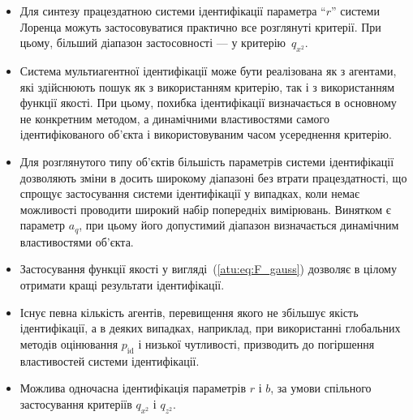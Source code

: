 \begin{itemize}

  \item
    Для синтезу працездатною системи ідентифікації параметра
    ``$r$'' системи Лоренца можуть застосовуватися практично все
    розглянуті критерії. При цьому, більший діапазон застосовності
    --- у критерію~$ q_{x^2} $.

  \item
    Система мультиагентної ідентифікації може бути реалізована
    як з агентами, які здійснюють пошук як з використанням
    критерію, так і з використанням функції якості. При цьому,
    похибка ідентифікації визначається в основному не конкретним
    методом, а динамічними властивостями самого ідентифікованого
    об'єкта і використовуваним часом усереднення критерію.

  \item
    Для розглянутого типу об'єктів більшість параметрів системи
    ідентифікації дозволяють зміни в досить широкому діапазоні
    без втрати працездатності, що спрощує застосування системи
    ідентифікації у випадках, коли немає можливості проводити
    широкий набір попередніх вимірювань. Винятком є параметр
    $a_q$, при цьому його допустимий діапазон визначається динамічним
    властивостями об'єкта.

  \item
    Застосування функції якості у вигляді~(\ref{atu:eq:F_gauss}) дозволяє в
    цілому отримати кращі результати ідентифікації.

  \item
    Існує певна кількість агентів, перевищення якого не збільшує
    якість ідентифікації, а в деяких випадках, наприклад, при
    використанні глобальних методів оцінювання
    $p_\mathrm{id} $ і низької чутливості, призводить до погіршення
    властивостей системи ідентифікації.

  \item
    Можлива одночасна ідентифікація параметрів
    $r$ і
    $b$, за умови спільного застосування критеріїв
    $q_{x^2}$ і
    $q_{z^2}$.

\end{itemize}








